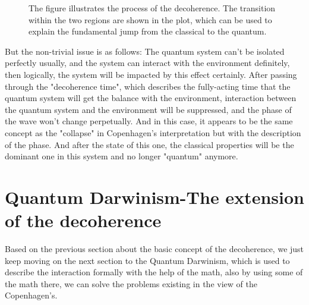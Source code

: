 \documentclass[final,1p,12pt]{elsarticle}
\begin{document}
\begin{figure}
\begin{center}
\end{center}
\caption{The figure illustrates the process of the decoherence. The transition within the two regions are shown in the plot, which can be used to explain the fundamental jump from the classical to the quantum. }
\label{9999}
\end{figure}

But the non-trivial issue is as follows: The quantum system can't be isolated perfectly usually, and the system can interact with the environment definitely, then logically, the system will be impacted by this effect certainly. After passing through the "decoherence time", which describes the fully-acting time that the quantum system will get the balance with the environment, interaction between the quantum system and the environment will be suppressed, and the phase of the wave won't change perpetually. And in this case, it appears to be the same concept as the "collapse" in Copenhagen's interpretation but with the description of the phase. And after the state of this one, the classical properties will be the dominant one in this system and no longer "quantum" anymore.\\

\section{Quantum Darwinism-The extension of the decoherence}
Based on the previous section about the basic concept of the decoherence, we just keep moving on the next section to the Quantum Darwinism, which is used to describe the interaction formally with the help of the math, also by using some of the math there, we can solve the problems existing in the view of the Copenhagen's.\\
 
\end{document}
